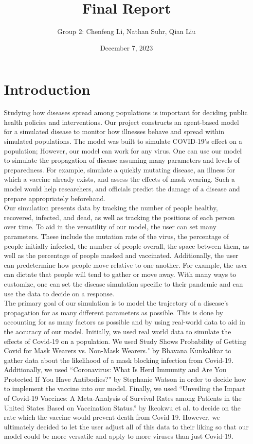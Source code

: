 \documentclass{article}
\title{Final Report}
\author{Group 2: Chenfeng Li, Nathan Suhr, Qian Liu}
\date{December 7, 2023}
\begin{document}
\maketitle


\section{Introduction}


Studying how diseases spread among populations is important for deciding public health policies and interventions. Our project constructs an agent-based model for a simulated disease to monitor how illnesses behave and spread within simulated populations. The model was built to simulate COVID-19's effect on a population; However, our model can work for any virus. One can use our model to simulate the propagation of disease assuming many parameters and levels of preparedness. For example, simulate a quickly mutating disease, an illness for which a vaccine already exists, and assess the effects of mask-wearing. Such a model would help researchers, and officials predict the damage of a disease and prepare appropriately beforehand.\\ \indent Our simulation presents data by tracking the number of people healthy, recovered, infected, and dead, as well as tracking the positions of each person over time. To aid in the versatility of our model, the user can set many parameters. These include the mutation rate of the virus, the percentage of people initially infected, the number of people overall, the space between them, as well as the percentage of people masked and vaccinated. Additionally, the user can predetermine how people move relative to one another. For example, the user can dictate that people will tend to gather or move away. With many ways to customize, one can set the disease simulation specific to their pandemic and can use the data to decide on a response. \\ \indent
The primary goal of our simulation is to model the trajectory of a disease's propagation for as many different parameters as possible. This is done by accounting for as many factors as possible and by using real-world data to aid in the accuracy of our model. Initially, we used real world data to simulate the effects of Covid-19 on a population. We used Study Shows Probability of Getting Covid for Mask Wearers vs. Non-Mask
Wearers." by Bhavana Kunkalikar to gather data about the likelihood of a mask blocking infection from Covid-19. Additionally, we used “Coronavirus: What Is Herd Immunity and Are You Protected If You Have
Antibodies?” by Stephanie Watson in order to decide how to implement the vaccine into our model. Finally, we used “Unveiling the Impact of Covid-19 Vaccines: A Meta-Analysis of Survival Rates among Patients in the United States Based on Vaccination Status.” by Ikeokwu et al. to decide on the rate which the vaccine would prevent death from Covid-19. However, we ultimately decided to let the user adjust all of this data to their liking so that our model could be more versatile and apply to more viruses than just Covid-19. 
\end{document}

